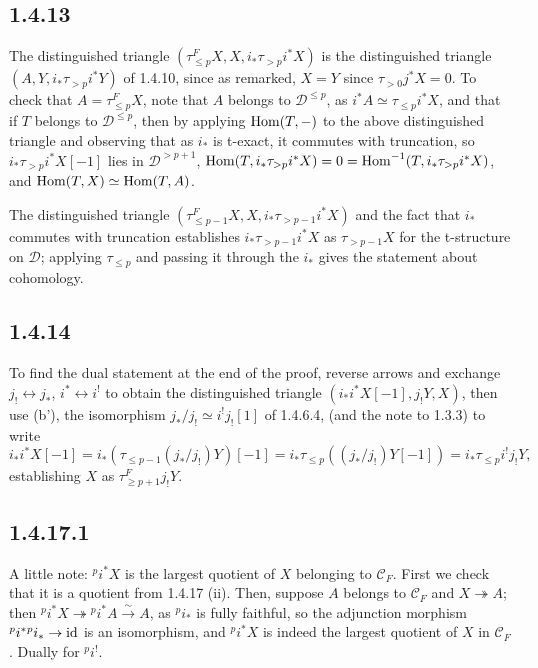 \documentclass[deligne.tex]{subfiles}
\begin{document}
	\subsection*{1.4.13} The distinguished triangle
	$(\tau_{\leq p}^FX,X,i_*\tau_{>p}i^*X)$ is the distinguished triangle
	$(A,Y,i_*\tau_{>p}i^*Y)$ of 1.4.10, since as remarked, $X=Y$ since
	$\tau_{>0}j^\ast X=0$. To check that $A=\tau_{\leq p}^FX$, note
	that $A$ belongs to $\mathcal D^{\leq p}$, as
	$i^\ast A\simeq\tau_{\leq p}i^\ast X$, and that if $T$ belongs to
	$\mathcal D^{\leq p}$, then by applying $\operatorname{Hom}(T,-)$ to the above
	distinguished triangle and observing that as $i_\ast$ is t-exact, it
	commutes with truncation, so
	$i_\ast\tau_{>p}i^\ast X[-1]$ lies in $\mathcal D^{>p+1}$,
	$\operatorname{Hom}(T,i_\ast\tau_{>p}i^*X)=0=\operatorname{Hom}^{-1}(T,i_\ast\tau_{>p}i^\ast X)$,
	and $\operatorname{Hom}(T,X)\simeq\operatorname{Hom}(T,A)$.
	
	The distinguished triangle $(\tau_{\leq p-1}^FX,X,i_*\tau_{>p-1}i^*X)$
	and the fact that $i_*$ commutes with truncation establishes
	$i_*\tau_{>p-1}i^*X$ as $\tau_{>p-1}X$ for the t-structure on 
	$\mathcal D$; applying $\tau_{\leq p}$ and passing it through the $i_*$
	gives the statement about cohomology.
	
	\subsection*{1.4.14} To find the dual statement at the end of the proof,
	reverse arrows and exchange $j_!\leftrightarrow j_*$,
	$i^*\leftrightarrow i^!$ to obtain the distinguished triangle
	$(i_*i^*X[-1],j_!Y,X)$, then use (b'), the isomorphism
	$j_*/j_!\simeq i^!j_![1]$ of 1.4.6.4, (and the note to 1.3.3) to write
	\begin{equation*}
		i_*i^*X[-1]=i_*(\tau_{\leq p-1}(j_*/j_!)Y)[-1]
		=i_*\tau_{\leq p}((j_*/j_!)Y[-1])
		=i_*\tau_{\leq p}i^!j_!Y,
	\end{equation*}
	establishing $X$ as $\tau^F_{\geq p+1}j_!Y$.
	
	\subsection*{1.4.17.1} A little note: $^p i^*X$ is the largest quotient of $X$
	belonging to $\mathcal C_F$. First we check that it is a quotient from
	1.4.17 (ii). Then, suppose $A$ belongs to $\mathcal C_F$ and
	$X\twoheadrightarrow A$; then $^pi^*X\twoheadrightarrow{}^pi^*A
	\xrightarrow{\sim}A$, as ${}^pi_*$ is fully faithful, so the adjunction
	morphism ${}^pi^*{}^pi_*\rightarrow\operatorname{id}$ is an isomorphism, and ${}^pi^*X$
	is indeed the largest quotient of $X$ in $\mathcal C_F$.
	Dually for ${}^pi^!$.
	
\end{document}

